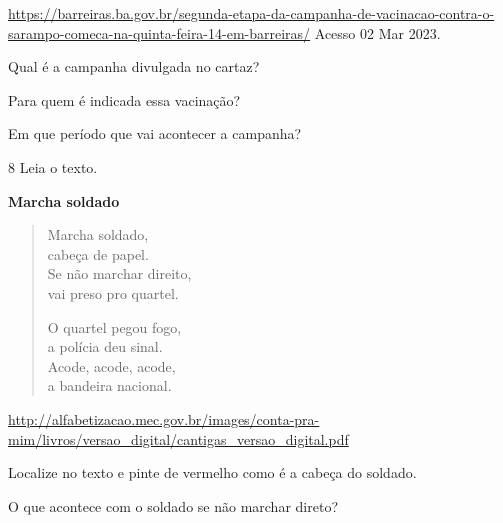 {{{\url{https://barreiras.ba.gov.br/segunda-etapa-da-campanha-de-vacinacao-contra-o-sarampo-comeca-na-quinta-feira-14-em-barreiras/}
Acesso 02 Mar 2023.

\begin{escolha}
	\item Qual é a campanha divulgada no cartaz?


	\item Para quem é indicada essa vacinação?


	\item Em que período que vai acontecer a campanha?
	
\end{escolha}

\num{8} Leia o texto.


\textbf{Marcha soldado}

\begin{verse}
Marcha soldado,\\
cabeça de papel.\\
Se não marchar direito,\\
vai preso pro quartel.

O quartel pegou fogo,\\
a polícia deu sinal.\\
Acode, acode, acode,\\
a bandeira nacional.
\end{verse}

\url{http://alfabetizacao.mec.gov.br/images/conta-pra-mim/livros/versao_digital/cantigas_versao_digital.pdf}

\begin{escolha}

	\item Localize no texto e pinte de vermelho como é a cabeça do soldado.

	\item O que acontece com o soldado se não marchar direto?


\end{escolha}

}}}
